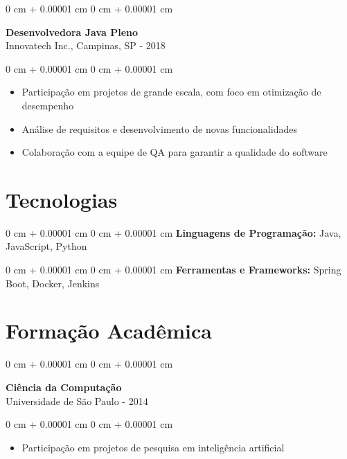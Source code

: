 \documentclass[10pt, letterpaper]{article}
\newenvironment{highlights}{
    \begin{itemize}[
        topsep=0.10 cm,
        parsep=0.10 cm,
        partopsep=0pt,
        itemsep=0pt,
        leftmargin=0 cm + 10pt
    ]
}{
    \end{itemize}
}
\newenvironment{onecolentry}{
    \begin{adjustwidth}{
        0 cm + 0.00001 cm
    }{
        0 cm + 0.00001 cm
    }
}{
    \end{adjustwidth}
}
\begin{document}
\vspace{0.2cm}

\begin{onecolentry}
    \setcolumnwidth{\fill, 4.5cm}
    \begin{paracol}{2}
        \textbf{Desenvolvedora Java Pleno} \\ Innovatech Inc., Campinas, SP
        \switchcolumn
         - 2018
    \end{paracol}
\end{onecolentry}
\vspace{0.10cm}
\begin{onecolentry}
    \begin{highlights}
                \item Participação em projetos de grande escala, com foco em otimização de desempenho
                \item Análise de requisitos e desenvolvimento de novas funcionalidades
                \item Colaboração com a equipe de QA para garantir a qualidade do software
    \end{highlights}
\end{onecolentry}

\section{Tecnologias}
\begin{onecolentry}{\textbf{Linguagens de Programação:} Java, JavaScript, Python}\end{onecolentry}
\vspace{0.1cm}
\begin{onecolentry}{\textbf{Ferramentas e Frameworks:} Spring Boot, Docker, Jenkins}\end{onecolentry}
\section{Formação Acadêmica}

\begin{onecolentry}
    \setcolumnwidth{\fill, 4.5cm}
    \begin{paracol}{2}
        \textbf{Ciência da Computação} \\ Universidade de São Paulo
        \switchcolumn
         - 2014
    \end{paracol}
\end{onecolentry}
\vspace{0.10cm}
\begin{onecolentry}
    \begin{highlights}
                \item Participação em projetos de pesquisa em inteligência artificial
    \end{highlights}
\end{onecolentry}
\end{document}
